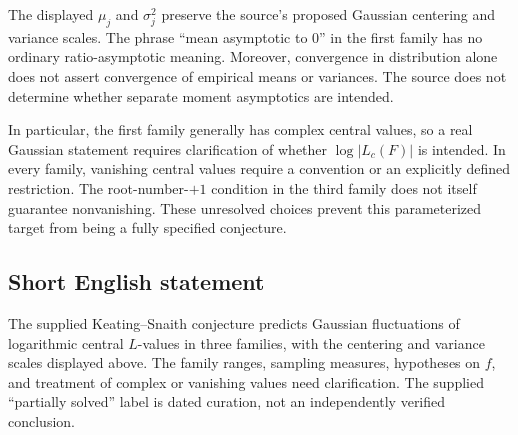 \documentclass[11pt]{article}
\begin{document}
The displayed \(\mu_j\) and \(\sigma_j^2\) preserve the source's proposed Gaussian centering and variance scales. The phrase ``mean asymptotic to \(0\)'' in the first family has no ordinary ratio-asymptotic meaning. Moreover, convergence in distribution alone does not assert convergence of empirical means or variances. The source does not determine whether separate moment asymptotics are intended.

In particular, the first family generally has complex central values, so a real Gaussian statement requires clarification of whether \(\log|L_c(F)|\) is intended. In every family, vanishing central values require a convention or an explicitly defined restriction. The root-number-\(+1\) condition in the third family does not itself guarantee nonvanishing. These unresolved choices prevent this parameterized target from being a fully specified conjecture.
\subsection{Short English statement}
The supplied Keating--Snaith conjecture predicts Gaussian fluctuations of logarithmic central \(L\)-values in three families, with the centering and variance scales displayed above. The family ranges, sampling measures, hypotheses on \(f\), and treatment of complex or vanishing values need clarification. The supplied ``partially solved'' label is dated curation, not an independently verified conclusion.
\end{document}
